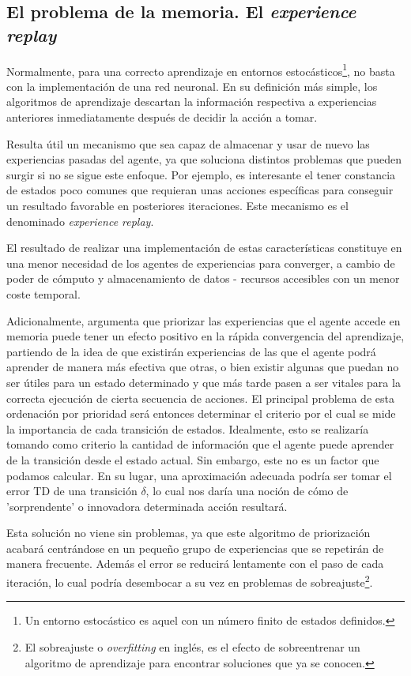 \documentclass[11pt,spanish,listoffigures,listoftables]{tfgetsinf}
\begin{document}
\subsection{El problema de la memoria. El \textit{experience replay}}

Normalmente, para una correcto aprendizaje en entornos estocásticos\footnote{Un entorno estocástico es aquel con un número finito de estados definidos.}, no basta con la implementación de una red neuronal. En su definición más simple, los algoritmos de aprendizaje descartan la información respectiva a experiencias anteriores inmediatamente después de decidir la acción a tomar.

Resulta útil un mecanismo que sea capaz de almacenar y usar de nuevo las experiencias pasadas del agente, ya que soluciona distintos problemas que pueden surgir si no se sigue este enfoque. Por ejemplo, es interesante el tener constancia de estados poco comunes que requieran unas acciones específicas para conseguir un resultado favorable en posteriores iteraciones. Este mecanismo es el denominado \textit{experience replay}.

El resultado de realizar una implementación de estas características constituye en una menor necesidad de los agentes de experiencias para converger, a cambio de poder de cómputo y almacenamiento de datos - recursos accesibles con un menor coste temporal.

Adicionalmente, \cite{exp_replay_prior} argumenta que priorizar las experiencias que el agente accede en memoria puede tener un efecto positivo en la rápida convergencia del aprendizaje, partiendo de la idea de que existirán experiencias de las que el agente podrá aprender de manera más efectiva que otras, o bien existir algunas que puedan no ser útiles para un estado determinado y que más tarde pasen a ser vitales para la correcta ejecución de cierta secuencia de acciones. El principal problema de esta ordenación por prioridad será entonces determinar el criterio por el cual se mide la importancia de cada transición de estados. Idealmente, esto se realizaría tomando como criterio la cantidad de información que el agente puede aprender de la transición desde el estado actual. Sin embargo, este no es un factor que podamos calcular. En su lugar, una aproximación adecuada podría ser tomar el error TD de una transición $\delta$, lo cual nos daría una noción de cómo de 'sorprendente' o innovadora determinada acción resultará.

Esta solución no viene sin problemas, ya que este algoritmo de priorización acabará centrándose en un pequeño grupo de experiencias que se repetirán de manera frecuente. Además el error se reducirá lentamente con el paso de cada iteración, lo cual podría desembocar a su vez en problemas de sobreajuste\footnote{El sobreajuste o \textit{overfitting} en inglés, es el efecto de sobreentrenar un algoritmo de aprendizaje para encontrar soluciones que ya se conocen.}.
\end{document}
